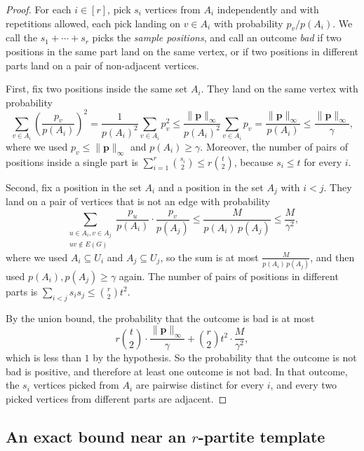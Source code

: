 \documentclass[11pt, a4paper]{article}
\theoremstyle{definition}
\theoremstyle{plain}
\renewcommand{\le}{\leqslant}
\renewcommand{\ge}{\geqslant}
\newcommand{\pmax}{\lVert \bm{p} \rVert_{\infty}}
\begin{document}
\begin{proof}
For each $i\in [r]$, pick $s_i$ vertices from $A_i$ independently and
with repetitions allowed, each pick landing on $v\in A_i$ with
probability $p_v/p(A_i)$. We call the $s_1+\cdots +s_r$ picks the
\emph{sample positions}, and call an outcome \emph{bad} if two
positions in the same part land on the same vertex, or if two positions
in different parts land on a pair of non-adjacent vertices.

First, fix two positions inside the same set $A_i$.
They land on the same vertex with probability
\[
  \sum_{v\in A_i}
    \left(\frac{p_v}{p(A_i)}\right)^{2}
  =\frac{1}{p(A_i)^2}\sum_{v\in A_i}p_v^2
  \le \frac{\pmax}{p(A_i)^2}\sum_{v\in A_i}p_v
  =\frac{\pmax}{p(A_i)}
  \le \frac{\pmax}{\gamma},
\]
where we used $p_v \le \pmax$ and $p(A_i)\ge \gamma$. 
Moreover, the
number of pairs of positions inside a single part is
$\sum_{i=1}^{r}\binom{s_i}{2}\le r\binom{t}{2}$,
because $s_i\le t$ for every $i$.

Second, fix a position in the set $A_i$ and a position in the set 
$A_j$ with $i<j$. They land on a pair of vertices
that is not an edge with probability
\[
  \sum_{\substack{u\in A_i, v\in A_j\\ uv\notin E(G)}}
  \frac{p_u}{p(A_i)}\cdot \frac{p_v}{p(A_j)}
  \le \frac{M}{p(A_i)\,p(A_j)}
  \le \frac{M}{\gamma^2}, 
\]
where we used $A_i\subseteq U_i$ and
$A_j\subseteq U_j$, so the sum  is
at most $ \frac{M}{p(A_i)\,p(A_j)}$, and then used 
$p(A_i),p(A_j)\ge \gamma$ again. The number of pairs
of positions in different parts is
$\sum_{i<j}s_is_j\le \binom{r}{2}t^2$.

By the union bound, the probability 
that the outcome is bad is at most
\[
   r\binom{t}{2} \cdot \frac{\pmax}{\gamma}
  +\binom{r}{2}t^2 \cdot \frac{M}{\gamma^2},
\]
which is less than $1$ by the hypothesis. So the probability that the
outcome is not bad is positive, and therefore at
least one outcome is not bad. In that outcome, the
$s_i$ vertices picked from $A_i$ are pairwise distinct for
every $i$, and every two picked vertices from
different parts are adjacent.
\end{proof}




\subsection{An exact bound near an $r$-partite
template} 
\end{document}
